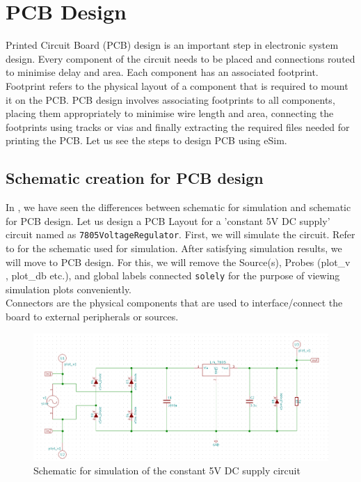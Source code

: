 \chapter{PCB Design}
\thispagestyle{empty}
\label{chap13}

Printed Circuit Board (PCB)  design is an important
step in electronic system design. Every component of the circuit
needs to be placed and connections routed to minimise delay and
area. Each component has an associated footprint. Footprint refers to
the physical layout of a component that is required to mount it on the
PCB. PCB design involves associating footprints to all components, placing them appropriately to
minimise wire length and area, connecting the footprints using
tracks or vias and finally extracting the required files needed for
printing the PCB. Let us see the steps to design PCB using eSim. 

\section{Schematic creation for PCB design}
In , we have seen the differences between schematic for
simulation and schematic for PCB design. Let us design a PCB Layout for a 'constant 5V DC supply'  circuit named as \texttt{7805VoltageRegulator}. First, we will simulate the circuit. Refer to  for the schematic used for simulation. After satisfying simulation results, we will move to PCB design. For this, we will remove the Source(s), Probes (plot\_v , plot\_db etc.), and global labels connected \texttt{solely} for the purpose of viewing simulation plots conveniently. \\  Connectors are the physical components that are used to interface/connect the board to external peripherals or sources.

\begin{figure}
\centering
\includegraphics[width=\lgfig]{NGHDL/pcbschinitial.png}
\caption{Schematic for simulation of the constant 5V DC supply circuit}
\label{pcbschfin}
\end{figure}
 
